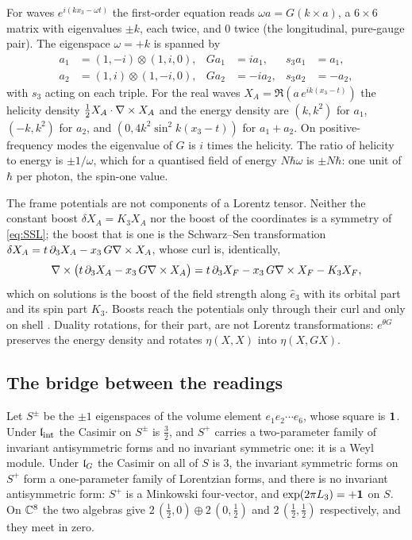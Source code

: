\begin{example}
\label{ex:Gcharge}
For waves $e^{i(k x_3-\omega t)}$ the first-order equation reads $\omega a=G(k\times a)$, a $6\times6$ matrix with eigenvalues $\pm k$, each
twice, and $0$ twice (the longitudinal, pure-gauge pair). The eigenspace $\omega=+k$ is spanned by
\[
\begin{aligned}
a_1&=(1,-i)\otimes(1,i,0), & Ga_1&=ia_1, & s_3a_1&=a_1,\\
a_2&=(1,i)\otimes(1,-i,0), & Ga_2&=-ia_2, & s_3a_2&=-a_2,
\end{aligned}
\]
with $s_3$ acting on each triple. For the real waves $X_A=\Re(a\,e^{ik(x_3-t)})$ the helicity density $\tfrac12X_A\cdot\nabla\times X_A$ and the
energy density are $(k,k^2)$ for $a_1$, $(-k,k^2)$ for $a_2$, and $(0,4k^2\sin^2k(x_3-t))$ for $a_1+a_2$. On positive-frequency modes the
eigenvalue of $G$ is $i$ times the helicity. The ratio of helicity to energy is $\pm1/\omega$, which for a quantised field of energy
$N\hbar\omega$ is $\pm N\hbar$: one unit of $\hbar$ per photon, the spin-one value.
\end{example}

The frame potentials are not components of a Lorentz tensor. Neither the constant boost $\delta X_A=K_3X_A$ nor the boost of the
coordinates is a symmetry of \eqref{eq:SSL}; the boost that is one is the Schwarz--Sen transformation $\delta X_A=t\,\partial_3X_A-x_3\,G\nabla\times
X_A$, whose curl is, identically,
\[
\nabla\times\bigl(t\,\partial_3X_A-x_3\,G\nabla\times X_A\bigr)=t\,\partial_3X_F-x_3\,G\nabla\times X_F-K_3X_F ,
\]
which on solutions is the boost of the field strength along $\hat e_3$ with its orbital part and its spin part $K_3$. Boosts reach the
potentials only through their curl and only on shell \cite{SchwarzSen94}. Duality rotations, for their part, are not Lorentz
transformations: $e^{\theta G}$ preserves the energy density and rotates $\eta(X,X)$ into $\eta(X,GX)$.

\subsection{The bridge between the readings}
\label{sec:bridge}

\begin{proposition}
\label{prop:halfspinors}
Let $S^\pm$ be the $\pm1$ eigenspaces of the volume element $e_1e_2\cdots e_6$, whose square is $\mathbf 1$. Under $\mathfrak l_{\rm int}$ the Casimir on $S^\pm$ is $\tfrac32$, and $S^+$ carries a two-parameter family of invariant antisymmetric forms and no
invariant symmetric one: it is a Weyl module. Under $\mathfrak l_G$ the Casimir on all of $S$ is $3$, the invariant symmetric forms on $S^+$ form a
one-parameter family of Lorentzian forms, and there is no invariant antisymmetric form: $S^+$ is a Minkowski four-vector, and
$\exp(2\pi L_3)=+\mathbf 1$ on $S$. On $\mathbb{C}^8$ the two algebras give $2\,(\tfrac12,0)\oplus2\,(0,\tfrac12)$ and $2\,(\tfrac12,\tfrac12)$
respectively, and they meet in zero.
\end{proposition}

